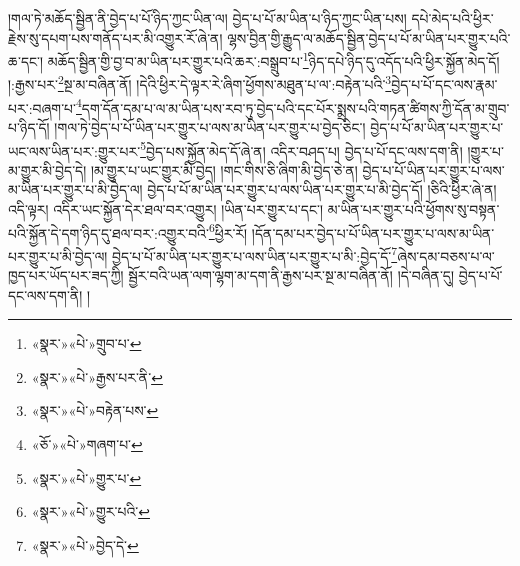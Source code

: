 །གལ་ཏེ་མཆོད་སྦྱིན་ནི་བྱེད་པ་པོ་ཉིད་ཀྱང་ཡིན་ལ། བྱེད་པ་པོ་མ་ཡིན་པ་ཉིད་ཀྱང་ཡིན་པས། དཔེ་མེད་པའི་ཕྱིར་རྗེས་སུ་དཔག་པས་གནོད་པར་མི་འགྱུར་རོ་ཞེ་ན། ལྷས་བྱིན་གྱི་རྒྱུད་ལ་མཆོད་སྦྱིན་བྱེད་པ་པོ་མ་ཡིན་པར་གྱུར་པའི་ཆ་དང་། མཆོད་སྦྱིན་གྱི་བྱ་བ་མ་ཡིན་པར་གྱུར་པའི་ཆར་:བསྒྲུབ་པ་\footnote{«སྣར་»«པེ་»གྲུབ་པ་}ཉིད་དཔེ་ཉིད་དུ་འདོད་པའི་ཕྱིར་སྐྱོན་མེད་དོ། །:རྒྱས་པར་\footnote{«སྣར་»«པེ་»རྒྱས་པར་ནི་}སྔ་མ་བཞིན་ནོ། །དེའི་ཕྱིར་དེ་ལྟར་རེ་ཞིག་ཕྱོགས་མཐུན་པ་ལ་:བརྟེན་པའི་\footnote{«སྣར་»«པེ་»བརྟེན་པས་}བྱེད་པ་པོ་དང་ལས་རྣམ་པར་:བཞག་པ་\footnote{«ཅོ་»«པེ་»གཞག་པ་}དག་དོན་དམ་པ་ལ་མ་ཡིན་པས་རབ་ཏུ་བྱེད་པའི་དང་པོར་སྨྲས་པའི་གཏན་ཚིགས་ཀྱི་དོན་མ་གྲུབ་པ་ཉིད་དོ། །གལ་ཏེ་བྱེད་པ་པོ་ཡིན་པར་གྱུར་པ་ལས་མ་ཡིན་པར་གྱུར་པ་བྱེད་ཅིང་། བྱེད་པ་པོ་མ་ཡིན་པར་གྱུར་པ་ཡང་ལས་ཡིན་པར་:གྱུར་པར་\footnote{«སྣར་»«པེ་»གྱུར་པ་}བྱེད་པས་སྐྱོན་མེད་དོ་ཞེ་ན། འདིར་བཤད་པ། བྱེད་པ་པོ་དང་ལས་དག་ནི། །གྱུར་པ་མ་གྱུར་མི་བྱེད་དེ། །མ་གྱུར་པ་ཡང་གྱུར་མི་བྱེད། །གང་གིས་ཅི་ཞིག་མི་བྱེད་ཅེ་ན། བྱེད་པ་པོ་ཡིན་པར་གྱུར་པ་ལས་མ་ཡིན་པར་གྱུར་པ་མི་བྱེད་ལ། བྱེད་པ་པོ་མ་ཡིན་པར་གྱུར་པ་ལས་ཡིན་པར་གྱུར་པ་མི་བྱེད་དོ། །ཅིའི་ཕྱིར་ཞེ་ན། འདི་ལྟར། འདིར་ཡང་སྐྱོན་དེར་ཐལ་བར་འགྱུར། །ཡིན་པར་གྱུར་པ་དང་། མ་ཡིན་པར་གྱུར་པའི་ཕྱོགས་སུ་བསྟན་པའི་སྐྱོན་དེ་དག་ཉིད་དུ་ཐལ་བར་:འགྱུར་བའི་\footnote{«སྣར་»«པེ་»གྱུར་པའི་}ཕྱིར་རོ། །དོན་དམ་པར་བྱེད་པ་པོ་ཡིན་པར་གྱུར་པ་ལས་མ་ཡིན་པར་གྱུར་པ་མི་བྱེད་ལ། བྱེད་པ་པོ་མ་ཡིན་པར་གྱུར་པ་ལས་ཡིན་པར་གྱུར་པ་མི་:བྱེད་དོ་\footnote{«སྣར་»«པེ་»བྱེད་དེ་}ཞེས་དམ་བཅས་པ་ལ་ཁྱད་པར་ཡོད་པར་ཟད་ཀྱི། སྦྱོར་བའི་ཡན་ལག་ལྷག་མ་དག་ནི་རྒྱས་པར་སྔ་མ་བཞིན་ནོ། །དེ་བཞིན་དུ། བྱེད་པ་པོ་དང་ལས་དག་ནི། །
